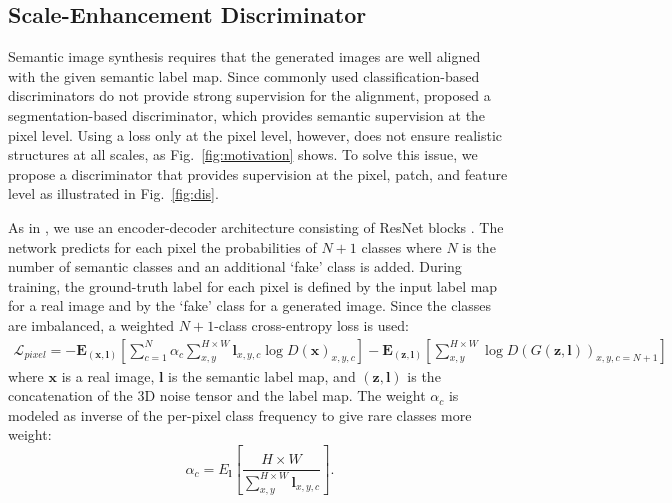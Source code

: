 \documentclass{bmvc2k}
\newcommand{\figref}[1]{Fig.~\ref{#1}}
\begin{document}
\subsection{Scale-Enhancement Discriminator}\label{sec:disc}

Semantic image synthesis requires that the generated images are well aligned with the given semantic label map. Since commonly used classification-based discriminators \cite{park2019semantic} do not provide strong supervision for the alignment, \cite{schonfeld_sushko_iclr2021} proposed a segmentation-based discriminator, which provides semantic supervision at the pixel level. Using a loss only at the pixel level, however, does not ensure realistic structures at all scales, as \figref{fig:motivation} shows. To solve this issue, we propose a discriminator that provides supervision at the pixel, patch, and feature level as illustrated in \figref{fig:dis}.

As in \cite{schonfeld_sushko_iclr2021}, we use an encoder-decoder architecture consisting of ResNet blocks \cite{he2016deep}. The network predicts for each pixel the probabilities of $N+1$ classes where $N$ is the number of semantic classes and an additional `fake' class is added.
During training, the ground-truth label for each pixel is defined by the input label map for a real image and by the `fake' class for a generated image. 
Since the classes are imbalanced, a weighted $N+1$-class cross-entropy loss is used:
\begin{equation}
\begin{split}
        \mathcal{L}_{pixel} = -\mathbf{E}_{(\mathbf{x}, \mathbf{l})}\left[\sum_{c=1}^N\alpha_c \sum_{x,y}^{H\times W}\mathbf{l}_{x,y,c} \log D(\mathbf{x})_{x,y,c}\right] 
        - \mathbf{E}_{(\mathbf{z},\mathbf{l})}\left[\sum_{x,y}^{H\times W}\log D(G(\mathbf{z},\mathbf{l}))_{x,y,c=N+1}\right]
\end{split}
    \label{eq:l_d_seg}
\end{equation}
where $\mathbf{x}$ is a real image, $\mathbf{l}$ is the semantic label map, and $(\mathbf{z}, \mathbf{l})$ is the concatenation of the 3D noise tensor and the label map.
The weight $\alpha_c$ is modeled as inverse of the per-pixel class frequency to give rare classes more weight:
\begin{equation}
    \alpha_c = E_{\mathbf{l}}\left[\frac{H\times W}{\sum_{x,y}^{H\times W} \mathbf{l}_{x,y,c}}\right].
\end{equation}
\end{document}
